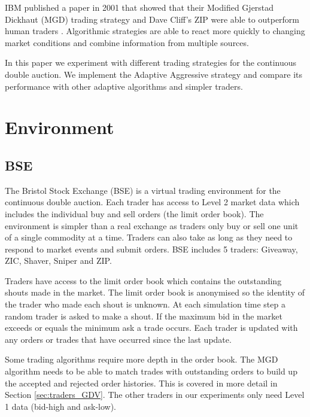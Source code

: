 \documentclass[preprint]{acm_proc_article-sp} %
\begin{document}
IBM published a paper in 2001 that showed that their Modified Gjerstad Dickhaut (MGD) trading strategy and
Dave Cliff's ZIP were able to outperform human traders \cite{ibm_human}.
Algorithmic strategies are able to react more quickly to changing market
conditions and combine information from multiple sources.

In this paper we experiment with different trading strategies for the
continuous double auction.
We implement the Adaptive Aggressive strategy \cite{AA_thesis} and compare its performance 
with other adaptive algorithms and simpler traders.\\



\section{Environment} \label{sec:environment}
\subsection{BSE} \label{sec:BSE}
The Bristol Stock Exchange (BSE) is a virtual trading environment for the
continuous double auction. Each trader has access to Level 2 market data which
includes the individual buy and sell orders (the limit order book). The
environment is simpler than a real exchange as traders only buy or sell one
unit of a single commodity at a time. Traders can also take as long as they
need to respond to market events and submit orders. BSE includes 5 traders: Giveaway, ZIC, Shaver, Sniper and ZIP.

Traders have access to the limit order book which contains the outstanding
shouts made in the market. The limit order book is anonymised so the identity
of the trader who made each shout is unknown. At each simulation time step a
random trader is asked to make a shout. If the maximum bid in the market
exceeds or equals the minimum ask a trade occurs. Each trader is updated with
any orders or trades that have occurred since the last update.

Some trading algorithms require more depth in the order book. The MGD algorithm needs to be able to match trades with
outstanding orders to build up the accepted and rejected order histories.
This is covered in more detail in Section \ref{sec:traders_GDV}. The
other traders in our experiments only need Level 1 data
(bid-high and ask-low).
\end{document}
